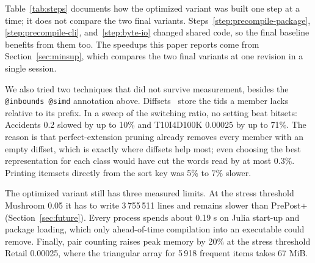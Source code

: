 Table~\ref{tab:steps} documents how the optimized variant was built one step at a time; it
does not compare the two final variants. Steps~\ref{step:precompile-package},
\ref{step:precompile-cli}, and~\ref{step:byte-io} changed shared code, so the final
baseline benefits from them too. The speedups this paper reports come from
Section~\ref{sec:minsup}, which compares the two final variants at one revision in a
single session.

We also tried two techniques that did not survive measurement, besides the
\texttt{@inbounds @simd} annotation above. Diffsets~\cite{zaki2003}
store the tids a member lacks relative to its prefix. In a sweep of the switching ratio,
no setting beat bitsets: Accidents 0.2 slowed by up to 10\% and T10I4D100K 0.00025 by up
to 71\%. The reason is that perfect-extension pruning already removes every member with
an empty diffset, which is exactly where diffsets help most; even choosing the best
representation for each class would have cut the words read by at most 0.3\%. Printing
itemsets directly from the sort key was 5\% to 7\% slower.

The optimized variant still has three measured limits. At the stress threshold
Mushroom 0.05 it has to write 3\,755\,511 lines and remains slower than PrePost+
(Section~\ref{sec:future}). Every process spends about 0.19 s on Julia start-up and package loading,
which only ahead-of-time compilation into an executable could remove. Finally, pair
counting raises peak memory by 20\% at the stress threshold Retail 0.00025, where the
triangular array for 5\,918 frequent items takes 67 MiB.
